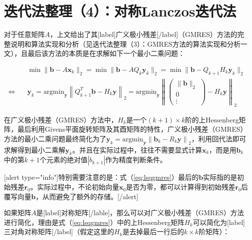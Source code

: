 \documentclass[UTF8,nofonts]{ctexart}
\begin{document}

\section*{迭代法整理（4）：对称Lanczos迭代法}

对于任意矩阵$A$，上文给出了其[label]广义极小残差[/label]（GMRES）方法的完整说明和算法实现和分析（见迭代法整理（3）：GMRES方法的算法实现和分析一文），且最后该方法的本质是在求解如下一个最小二乘问题：

\begin{equation}
	\label{eq:lsqgmres}
	\begin{aligned}
 		&
		\min\|\boldsymbol{b}-A\boldsymbol{x}_k\|_2 =
		\min\|\boldsymbol{b}-AQ_k\boldsymbol{y}_k\|_2 =
		\min\|\boldsymbol{b}-Q_{k+1}H_k\boldsymbol{y}_k\|_2 \\
		\Longleftrightarrow\quad &
		\boldsymbol{y}_k=\text{argmin}_{\boldsymbol{y}}
		\left\|Q^T_{k+1}\boldsymbol{b}-H_k\boldsymbol{y}\right\|_2
		=\text{argmin}_{\boldsymbol{y}}
		\left\|
			\begin{pmatrix} \|\boldsymbol{b}\|_2 \\ 0 \\ \vdots \end{pmatrix} - H_k\boldsymbol{y}
		\right\|_2
	\end{aligned}
\end{equation}

在广义极小残差（GMRES）方法中，$H_k$是一个$(k+1) \times k$阶的上Hessenberg矩阵，最后利用Givens平面旋转矩阵及其酉矩阵的特性，广义极小残差（GMRES）方法的最小二乘问题最终简化为了$\boldsymbol{y}_k=\text{argmin}_{\boldsymbol{y}}\left\|\boldsymbol{b}_k-R_k\boldsymbol{y}\right\|_2$，利用回代法即可求解得到最小二乘解$\boldsymbol{y}_k$。并且在实际过程中，往往不需要显式计算$\boldsymbol{x}_k$，而是用$\boldsymbol{b}_k$中的第$k+1$个元素的绝对值$|b_{k+1}|$作为精度判断条件。

[alert type="info"]特别需要注意的是：式（\ref{eq:lsqgmres}）最后的$\boldsymbol{b}$实际指的是初始残差$\boldsymbol{r}_0$。实际过程中，不论初始向量$\boldsymbol{x}_0$是否为零，都可以计算得到初始残差$\boldsymbol{r}_0$后覆写向量$\boldsymbol{b}$，从而避免了额外的存储。[/alert]

如果矩阵$A$是[label]对称矩阵[/lable]，那么可以对广义极小残差（GMRES）方法进行简化，理由是式（\ref{eq:lsqgmres}）中的上Hessenberg矩阵$H_k$可以简化为[label]三对角对称矩阵[/label]（假定这里的$H_k$是去掉最后一行后的$k \times k$阶矩阵）：
\end{document}
